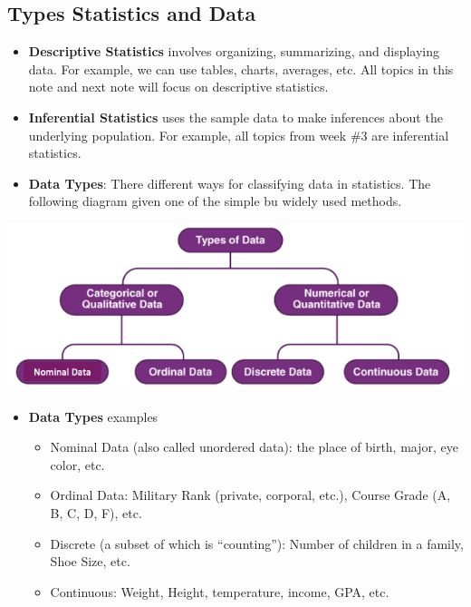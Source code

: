 \documentclass[
]{book}
\providecommand{\tightlist}{%
  \setlength{\itemsep}{0pt}\setlength{\parskip}{0pt}}
\begin{document}
\hypertarget{types-statistics-and-data}{%
\subsection{Types Statistics and Data}\label{types-statistics-and-data}}

\begin{itemize}
\item
  \textbf{Descriptive Statistics} involves organizing, summarizing, and displaying data. For example, we can use tables, charts, averages, etc. All topics in this note and next note will focus on descriptive statistics.
\item
  \textbf{Inferential Statistics} uses the sample data to make inferences about the underlying population. For example, all topics from week \#3 are inferential statistics.
\item
  \textbf{Data Types}: There different ways for classifying data in statistics. The following diagram given one of the simple bu widely used methods.
\end{itemize}

\begin{center}\includegraphics[width=0.7\linewidth]{week01/dataTypes} \end{center}

\begin{itemize}
\item
  \textbf{Data Types} examples

  \begin{itemize}
  \tightlist
  \item
    Nominal Data (also called unordered data): the place of birth, major, eye color, etc.
  \item
    Ordinal Data: Military Rank (private, corporal, etc.), Course Grade (A, B, C, D, F), etc.
  \item
    Discrete (a subset of which is ``counting''): Number of children in a family, Shoe Size, etc.
  \item
    Continuous: Weight, Height, temperature, income, GPA, etc.
  \end{itemize}
\end{itemize}
\end{document}

